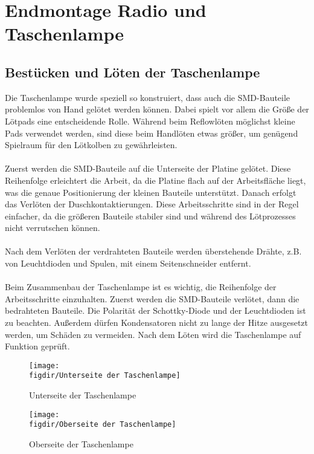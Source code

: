 \section{Endmontage Radio und Taschenlampe}

\subsection{Bestücken und Löten der Taschenlampe}
Die Taschenlampe wurde speziell so konstruiert, dass auch die SMD-Bauteile problemlos von Hand gelötet werden können.
Dabei spielt vor allem die Größe der Lötpads eine entscheidende Rolle.
Während beim Reflowlöten möglichst kleine Pads verwendet werden, sind diese beim Handlöten etwas größer, um genügend Spielraum für den Lötkolben zu gewährleisten.\\
\\
Zuerst werden die SMD-Bauteile auf die Unterseite der Platine gelötet.
Diese Reihenfolge erleichtert die Arbeit, da die Platine flach auf der Arbeitsfläche liegt, was die genaue Positionierung der kleinen Bauteile unterstützt.
Danach erfolgt das Verlöten der Duschkontaktierungen.
Diese Arbeitsschritte sind in der Regel einfacher, da die größeren Bauteile stabiler sind und während des Lötprozesses nicht verrutschen können.\\
\\
Nach dem Verlöten der verdrahteten Bauteile werden überstehende Drähte, z.B. von Leuchtdioden und Spulen, mit einem Seitenschneider entfernt.\\
\\
Beim Zusammenbau der Taschenlampe ist es wichtig, die Reihenfolge der Arbeitsschritte einzuhalten. Zuerst werden die SMD-Bauteile verlötet, dann die bedrahteten Bauteile.
Die Polarität der Schottky-Diode und der Leuchtdioden ist zu beachten.
Außerdem dürfen Kondensatoren nicht zu lange der Hitze ausgesetzt werden, um Schäden zu vermeiden. Nach dem Löten wird die Taschenlampe auf Funktion geprüft.

\begin{figure}[H]
    \centering
    \texttt{[image: \\figdir/Unterseite der Taschenlampe]}
    \caption{Unterseite der Taschenlampe}
    \label{fig: Abbildung 11}
\end{figure}

\begin{figure}[H]
    \centering
    \texttt{[image: \\figdir/Oberseite der Taschenlampe]}
    \caption{Oberseite der Taschenlampe}
    \label{fig:fig: Abbildung 12}
\end{figure}

